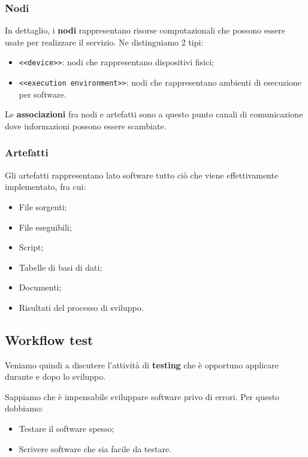 \documentclass[a4paper,11pt]{article}
\begin{document}
\subsubsection{Nodi}
In dettaglio, i \textbf{nodi} rappresentano risorse computazionali che possono essere usate per realizzare il servizio. Ne distinguiamo 2 tipi:
\begin{itemize}
	\item \lstinline|<<device>>|: nodi che rappresentano dispositivi fisici;
	\item \lstinline|<<execution environment>>|: nodi che rappresentano ambienti di esecuzione per software.
\end{itemize}

Le \textbf{associazioni} fra nodi e artefatti sono a questo punto canali di comunicazione dove informazioni possono essere scambiate.

\subsubsection{Artefatti}
Gli artefatti rappresentano lato software tutto ciò che viene effettivamente implementato, fra cui:

\begin{itemize}
	\item File sorgenti;
	\item File eseguibili;
	\item Script;
	\item Tabelle di basi di dati;
	\item Documenti;
	\item Risultati del processo di sviluppo.
\end{itemize}

\subsection{Workflow test}
Veniamo quindi a discutere l'attività di \textbf{testing} che è opportuno applicare durante e dopo lo sviluppo.

Sappiamo che è impensabile sviluppare software privo di errori.
Per questo dobbiamo:
\begin{itemize}
	\item Testare il software spesso;
	\item Scrivere software che sia facile da testare.
\end{itemize}
\end{document}
